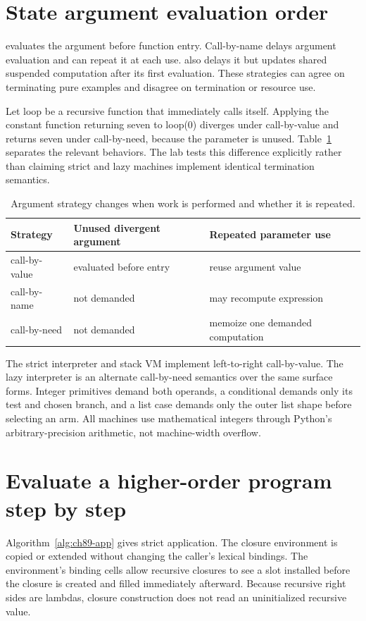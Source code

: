 \section{State argument evaluation order}
\label{sec:ch89-strictness}
 evaluates the argument before function entry.
Call-by-name delays argument evaluation and can repeat it at each use.
 also delays it but updates shared suspended computation after its first evaluation.
These strategies can agree on terminating pure examples and disagree on termination or resource use.

Let loop be a recursive function that immediately calls itself.
Applying the constant function returning seven to loop(0) diverges under call-by-value and returns seven under call-by-need, because the parameter is unused.
Table~\ref{tab:ch89-strategies} separates the relevant behaviors.
The lab tests this difference explicitly rather than claiming strict and lazy machines implement identical termination semantics.

\begin{table}[htbp]
\caption{Argument strategy changes when work is performed and whether it is repeated.}
\label{tab:ch89-strategies}
\centering
\begin{tabular}{lll}
\toprule
Strategy & Unused divergent argument & Repeated parameter use \\
\midrule
call-by-value & evaluated before entry & reuse argument value \\
call-by-name & not demanded & may recompute expression \\
call-by-need & not demanded & memoize one demanded computation \\
\bottomrule
\end{tabular}
\end{table}

The strict interpreter and stack VM implement left-to-right call-by-value.
The lazy interpreter is an alternate call-by-need semantics over the same surface forms.
Integer primitives demand both operands, a conditional demands only its test and chosen branch, and a list case demands only the outer list shape before selecting an arm.
All machines use mathematical integers through Python's arbitrary-precision arithmetic, not machine-width overflow.

\section{Evaluate a higher-order program step by step}
\label{sec:ch89-evaluate}
Algorithm~\ref{alg:ch89-app} gives strict application.
The closure environment is copied or extended without changing the caller's lexical bindings.
The environment's binding cells allow recursive closures to see a slot installed before the closure is created and filled immediately afterward.
Because recursive right sides are lambdas, closure construction does not read an uninitialized recursive value.


